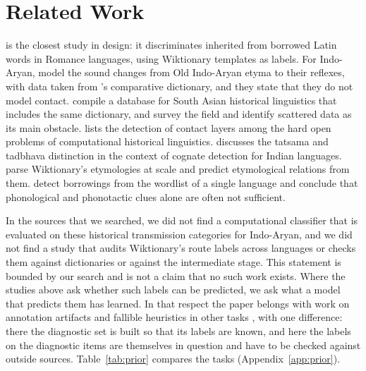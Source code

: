 \documentclass[11pt]{article}
\begin{document}
\section{Related Work}

\citet{cristea2021inherited} is the closest study in design: it discriminates inherited from borrowed Latin words in Romance languages, using Wiktionary templates as labels. For Indo-Aryan, \citet{cathcart2020disentangling} model the sound changes from Old Indo-Aryan etyma to their reflexes, with data taken from \citeauthor{turner1966cdial}'s comparative dictionary, and they state that they do not model contact. \citet{arora2023jambu} compile a database for South Asian historical linguistics that includes the same dictionary, and \citet{arora2022computational} survey the field and identify scattered data as its main obstacle. \citet{list2024openproblems} lists the detection of contact layers among the hard open problems of computational historical linguistics. \citet[\S4.1]{kanojia2021thesis} discusses the tatsama and tadbhava distinction in the context of cognate detection for Indian languages. \citet{wu2020computational} parse Wiktionary's etymologies at scale and predict etymological relations from them. \citet{miller2020lexical} detect borrowings from the wordlist of a single language and conclude that phonological and phonotactic clues alone are often not sufficient.

In the sources that we searched, we did not find a computational classifier that is evaluated on these historical transmission categories for Indo-Aryan, and we did not find a study that audits Wiktionary's route labels across languages or checks them against dictionaries or against the intermediate stage. This statement is bounded by our search and is not a claim that no such work exists. Where the studies above ask whether such labels can be predicted, we ask what a model that predicts them has learned. In that respect the paper belongs with work on annotation artifacts and fallible heuristics in other tasks \citep{gururangan2018annotation,mccoy2019right}, with one difference: there the diagnostic set is built so that its labels are known, and here the labels on the diagnostic items are themselves in question and have to be checked against outside sources. Table~\ref{tab:prior} compares the tasks (Appendix~\ref{app:prior}).
\end{document}
